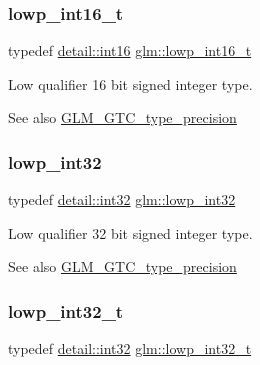 \subsubsection{\texorpdfstring{lowp\+\_\+int16\+\_\+t}{lowp\_int16\_t}}
{\footnotesize\ttfamily typedef \mbox{\hyperlink{namespaceglm_1_1detail_a375938874ca4f0a0982ec6373b56117b}{detail\+::int16}} \mbox{\hyperlink{group__gtc__type__precision_gae34c3d53c4c1434fc9f26538b0185667}{glm\+::lowp\+\_\+int16\+\_\+t}}}

Low qualifier 16 bit signed integer type. \begin{DoxySeeAlso}{See also}
\mbox{\hyperlink{group__gtc__type__precision}{G\+L\+M\+\_\+\+G\+T\+C\+\_\+type\+\_\+precision}} 
\end{DoxySeeAlso}
\mbox{\label{group__gtc__type__precision_gad9939c9d6fec1c6accc02a83c6500f08}} 
\subsubsection{\texorpdfstring{lowp\+\_\+int32}{lowp\_int32}}
{\footnotesize\ttfamily typedef \mbox{\hyperlink{namespaceglm_1_1detail_a9f85b4efeca416cdcec2fd08939a2e17}{detail\+::int32}} \mbox{\hyperlink{group__gtc__type__precision_gad9939c9d6fec1c6accc02a83c6500f08}{glm\+::lowp\+\_\+int32}}}

Low qualifier 32 bit signed integer type. \begin{DoxySeeAlso}{See also}
\mbox{\hyperlink{group__gtc__type__precision}{G\+L\+M\+\_\+\+G\+T\+C\+\_\+type\+\_\+precision}} 
\end{DoxySeeAlso}
\mbox{\label{group__gtc__type__precision_gad9567c806dc39f534174eef42663119d}} 
\subsubsection{\texorpdfstring{lowp\+\_\+int32\+\_\+t}{lowp\_int32\_t}}
{\footnotesize\ttfamily typedef \mbox{\hyperlink{namespaceglm_1_1detail_a9f85b4efeca416cdcec2fd08939a2e17}{detail\+::int32}} \mbox{\hyperlink{group__gtc__type__precision_gad9567c806dc39f534174eef42663119d}{glm\+::lowp\+\_\+int32\+\_\+t}}}

